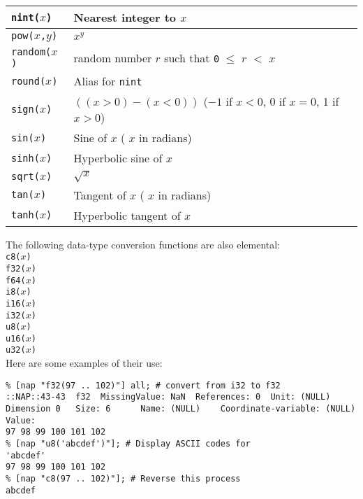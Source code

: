 \begin{tabular}{|l|l|}
      \hline 
        \texttt{nint(}$x$\texttt{)} & Nearest integer to $x$
      \\
      \hline 
        \texttt{pow(}$x$\texttt{,}$y$\texttt{)} & $x^y$
      \\
      \hline 
        \texttt{random(}$x$\texttt{)} & random number $r$ such that \texttt{0} $\le$ $r$ $<$ $x$
      \\
      \hline 
        \texttt{round(}$x$\texttt{)} & Alias for \texttt{nint}
      \\
      \hline 
        \texttt{sign(}$x$\texttt{)} & $((x>0)-(x<0))$ ($-1$ if $x<0$, 0 if $x=0$, 1 if $x>0$)
      \\
      \hline 
        \texttt{sin(}$x$\texttt{)} & Sine of $x$ ( $x$ in radians)
      \\
      \hline 
        \texttt{sinh(}$x$\texttt{)} & Hyperbolic sine of $x$
      \\
      \hline 
        \texttt{sqrt(}$x$\texttt{)} & $\sqrt x$
      \\
      \hline 
        \texttt{tan(}$x$\texttt{)} & Tangent of $x$ ( $x$ in radians)
      \\
      \hline 
        \texttt{tanh(}$x$\texttt{)} & Hyperbolic tangent of $x$
      \\
  \hline
\end{tabular}

  \par The following data-type conversion functions are also elemental:
  \\
  \texttt{c8(}$x$\texttt{)} \\
  \texttt{f32(}$x$\texttt{)} \\
  \texttt{f64(}$x$\texttt{)} \\
  \texttt{i8(}$x$\texttt{)} \\
  \texttt{i16(}$x$\texttt{)} \\
  \texttt{i32(}$x$\texttt{)} \\
  \texttt{u8(}$x$\texttt{)} \\
  \texttt{u16(}$x$\texttt{)} \\
  \texttt{u32(}$x$\texttt{)} \\
Here are some examples of their use:
  \begin{verbatim}
% [nap "f32(97 .. 102)"] all; # convert from i32 to f32
::NAP::43-43  f32  MissingValue: NaN  References: 0  Unit: (NULL)
Dimension 0   Size: 6      Name: (NULL)    Coordinate-variable: (NULL)
Value:
97 98 99 100 101 102
% [nap "u8('abcdef')"]; # Display ASCII codes for
'abcdef'
97 98 99 100 101 102
% [nap "c8(97 .. 102)"]; # Reverse this process
abcdef
\end{verbatim}

